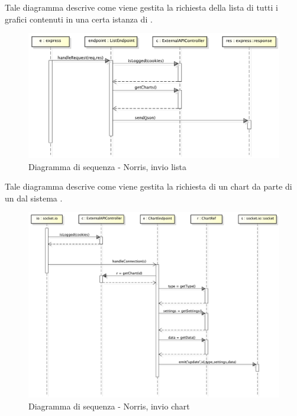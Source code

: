             
        	Tale diagramma descrive come viene gestita la richiesta della lista di tutti i grafici contenuti in una certa istanza di .
            \begin{figure}[H]
                \centering
                \includegraphics[scale=0.3]{DefinizioneDiProdotto/Pics/NorrisInvioLista}
                \caption{Diagramma di sequenza - Norris, invio lista}
            \end{figure}

            
        	Tale diagramma descrive come viene gestita la richiesta di un chart da parte di un  dal sistema .
            \begin{figure}[H]
                \centering
                \includegraphics[scale=0.3]{DefinizioneDiProdotto/Pics/NorrisInvioChart}
                \caption{Diagramma di sequenza - Norris, invio chart}
            \end{figure}
